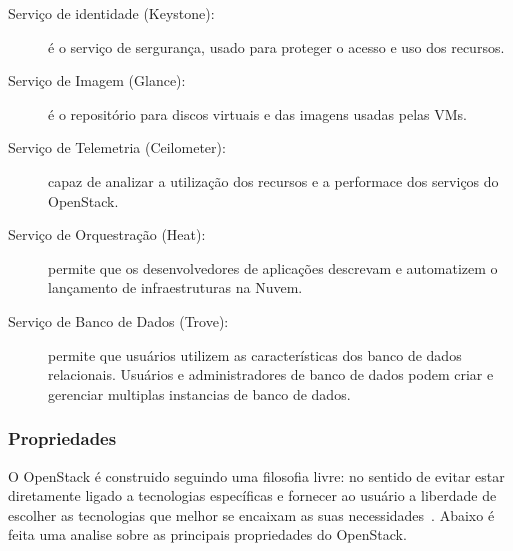 \begin{description}

	\item[Serviço de identidade (Keystone):] é o serviço de sergurança, usado para proteger o acesso e uso dos recursos.

	\item[Serviço de Imagem (Glance):] é o repositório para discos virtuais e das imagens usadas pelas VMs.

	\item[Serviço de Telemetria (Ceilometer):] capaz de analizar a utilização dos recursos e a performace dos serviços do OpenStack.

	\item[Serviço de Orquestração (Heat):] permite que os desenvolvedores de aplicações descrevam e automatizem o lançamento de infraestruturas na Nuvem.

	\item[Serviço de Banco de Dados (Trove):] permite que usuários utilizem as características dos banco de dados relacionais. Usuários e administradores de banco de dados podem criar e gerenciar multiplas instancias de banco de dados.

\end{description}

\subsubsection{Propriedades}

O OpenStack é construido seguindo uma filosofia livre: no sentido de evitar estar diretamente ligado a tecnologias específicas e fornecer ao usuário a liberdade de escolher as tecnologias que melhor se encaixam as suas necessidades~\cite{OpenStack:Online}. Abaixo é feita uma analise sobre as principais propriedades do OpenStack.

